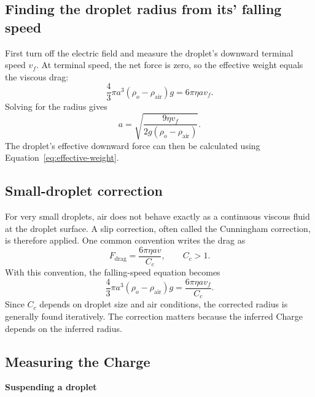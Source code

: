 \documentclass[a4paper, 10pt, onepage]{elegantbook}
\begin{document}
{\subsection{Finding the droplet radius from its' falling speed}

First turn off the electric field and measure the droplet's downward
terminal speed \(v_f\). At terminal speed, the net force is zero, so
the effective weight equals the viscous drag:
\begin{equation}
\frac{4}{3}\pi a^3
(\rho_o-\rho_{\mathrm{air}})g
=6\pi\eta a v_f.
\label{eq:fall-balance}
\end{equation}
Solving for the radius gives
\begin{equation}
a=
\sqrt{
\frac{9\eta v_f}
{2g(\rho_o-\rho_{\mathrm{air}})}
}.
\label{eq:radius}
\end{equation}
The droplet's effective downward force can then be calculated using
Equation~\eqref{eq:effective-weight}.

\subsection{Small-droplet correction}

For very small droplets, air does not behave exactly as a continuous
viscous fluid at the droplet surface. A slip correction, often called
the Cunningham correction, is therefore applied. One common
convention writes the drag as
\begin{equation}
F_{\mathrm{drag}}
=\frac{6\pi\eta a v}{C_c},
\qquad C_c>1.
\label{eq:cunningham}
\end{equation}
With this convention, the falling-speed equation becomes
\begin{equation}
\frac{4}{3}\pi a^3
(\rho_o-\rho_{\mathrm{air}})g
=\frac{6\pi\eta a v_f}{C_c}.
\label{eq:fall-corrected}
\end{equation}
Since \(C_c\) depends on droplet size and air conditions, the corrected
radius is generally found iteratively. The correction matters because
the inferred Charge depends on the inferred radius.

\subsection{Measuring the Charge}

\textbf{Suspending a droplet}

}
\end{document}
